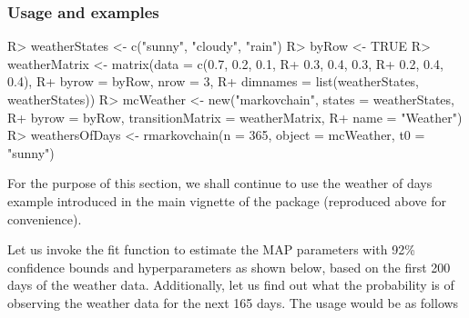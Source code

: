 \documentclass[article,nojss]{jss}
\begin{document}
\hypertarget{usage-and-examples}{%
\subsubsection{Usage and examples}\label{usage-and-examples}}

\begin{CodeChunk}

\begin{CodeInput}
R> weatherStates <- c("sunny", "cloudy", "rain")
R> byRow <- TRUE
R> weatherMatrix <- matrix(data = c(0.7, 0.2, 0.1, 
R+                                  0.3, 0.4, 0.3, 
R+                                  0.2, 0.4, 0.4), 
R+                         byrow = byRow, nrow = 3, 
R+                         dimnames = list(weatherStates, weatherStates))
R> mcWeather <- new("markovchain", states = weatherStates, 
R+                  byrow = byRow, transitionMatrix = weatherMatrix, 
R+                  name = "Weather")      
R> weathersOfDays <- rmarkovchain(n = 365, object = mcWeather, t0 = "sunny")
\end{CodeInput}
\end{CodeChunk}

For the purpose of this section, we shall continue to use the weather of days example introduced in the main vignette of the package (reproduced above for convenience).

Let us invoke the fit function to estimate the MAP parameters with 92\% confidence bounds and hyperparameters as shown below, based on the first 200 days of the weather data. Additionally, let us find out what the probability is of observing the weather data for the next 165 days. The usage would be as follows
\end{document}
